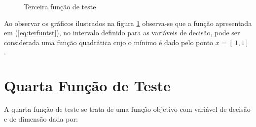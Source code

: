 \begin{figure}[h!]
    \centering 
    \qquad
    \qquad
    \caption{Terceira função de teste}%
    \label{fig:terfun}%
\end{figure}
\FloatBarrier

Ao observar os gráficos ilustrados na figura \ref{fig:terfun} observa-se que a função apresentada em (\ref{eq:terfuntst}), no intervalo definido para as variáveis de decisão, pode ser considerada uma função quadrática cujo o mínimo é dado pelo ponto $x=[\ 1 , 1 ]\ $.

\section{Quarta Função de Teste}\label{sec:quafun}

A quarta função de teste se trata de uma função objetivo com variável de decisão e de dimensão	dada por:

